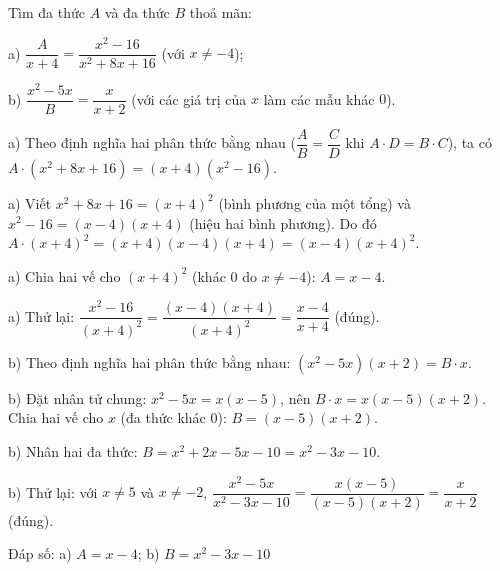 \begin{problem}[8DS-PS-036]
Tìm đa thức $A$ và đa thức $B$ thoả mãn:

a) $\dfrac{A}{x + 4} = \dfrac{x^2 - 16}{x^2 + 8x + 16}$ (với $x \neq -4$);

b) $\dfrac{x^2 - 5x}{B} = \dfrac{x}{x + 2}$ (với các giá trị của $x$ làm các mẫu khác $0$).

\begin{solution}
a) Theo định nghĩa hai phân thức bằng nhau ($\dfrac{A}{B} = \dfrac{C}{D}$ khi $A \cdot D = B \cdot C$), ta có $A \cdot (x^2 + 8x + 16) = (x + 4)(x^2 - 16)$.

a) Viết $x^2 + 8x + 16 = (x + 4)^2$ (bình phương của một tổng) và $x^2 - 16 = (x - 4)(x + 4)$ (hiệu hai bình phương). Do đó $A \cdot (x + 4)^2 = (x + 4)(x - 4)(x + 4) = (x - 4)(x + 4)^2$.

a) Chia hai vế cho $(x + 4)^2$ (khác $0$ do $x \neq -4$): $A = x - 4$.

a) Thử lại: $\dfrac{x^2 - 16}{(x + 4)^2} = \dfrac{(x - 4)(x + 4)}{(x + 4)^2} = \dfrac{x - 4}{x + 4}$ (đúng).

b) Theo định nghĩa hai phân thức bằng nhau: $(x^2 - 5x)(x + 2) = B \cdot x$.

b) Đặt nhân tử chung: $x^2 - 5x = x(x - 5)$, nên $B \cdot x = x(x - 5)(x + 2)$. Chia hai vế cho $x$ (đa thức khác $0$): $B = (x - 5)(x + 2)$.

b) Nhân hai đa thức: $B = x^2 + 2x - 5x - 10 = x^2 - 3x - 10$.

b) Thử lại: với $x \neq 5$ và $x \neq -2$, $\dfrac{x^2 - 5x}{x^2 - 3x - 10} = \dfrac{x(x - 5)}{(x - 5)(x + 2)} = \dfrac{x}{x + 2}$ (đúng).

Đáp số: a) $\boxed{A = x - 4}$; b) $\boxed{B = x^2 - 3x - 10}$
\end{solution}
\end{problem}

